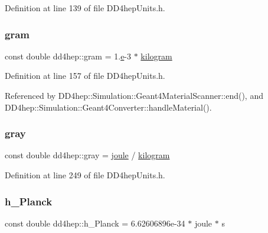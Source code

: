 Definition at line 139 of file D\+D4hep\+Units.\+h.

\hypertarget{namespacedd4hep_ab7942148388bbfa1f47578732153f293}{}\label{namespacedd4hep_ab7942148388bbfa1f47578732153f293} 
\subsubsection{\texorpdfstring{gram}{gram}}
{\footnotesize\ttfamily const double dd4hep\+::gram = 1.\hyperlink{_volumes_8cpp_a8a9a1f93e9b09afccaec215310e64142}{e}-\/3 $\ast$ \hyperlink{namespacedd4hep_a94c5d58440a5bf3d43b1edaa51ae5294}{kilogram}\hspace{0.3cm}{\ttfamily [static]}}



Definition at line 157 of file D\+D4hep\+Units.\+h.



Referenced by D\+D4hep\+::\+Simulation\+::\+Geant4\+Material\+Scanner\+::end(), and D\+D4hep\+::\+Simulation\+::\+Geant4\+Converter\+::handle\+Material().

\hypertarget{namespacedd4hep_a35738d027f0d6649943f74cfc26bb7fc}{}\label{namespacedd4hep_a35738d027f0d6649943f74cfc26bb7fc} 
\subsubsection{\texorpdfstring{gray}{gray}}
{\footnotesize\ttfamily const double dd4hep\+::gray = \hyperlink{namespacedd4hep_a8cdc11c61e5f953baede59569544a324}{joule} / \hyperlink{namespacedd4hep_a94c5d58440a5bf3d43b1edaa51ae5294}{kilogram}\hspace{0.3cm}{\ttfamily [static]}}



Definition at line 249 of file D\+D4hep\+Units.\+h.

\hypertarget{namespacedd4hep_a673d90bb18d025dec577177927fac9f0}{}\label{namespacedd4hep_a673d90bb18d025dec577177927fac9f0} 
\subsubsection{\texorpdfstring{h\+\_\+\+Planck}{h\_Planck}}
{\footnotesize\ttfamily const double dd4hep\+::h\+\_\+\+Planck = 6.\+62606896e-\/34 $\ast$ joule $\ast$ s\hspace{0.3cm}{\ttfamily [static]}}



